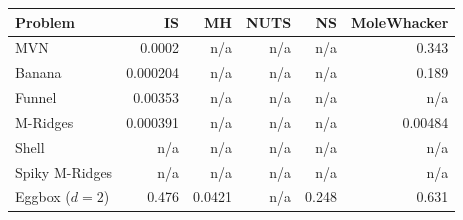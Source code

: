 \begin{tabular}{lrrrrr}
\toprule
Problem & IS & MH & NUTS & NS & MoleWhacker \\
\midrule
MVN & 0.0002 & n/a & n/a & n/a & 0.343 \\
Banana & 0.000204 & n/a & n/a & n/a & 0.189 \\
Funnel & 0.00353 & n/a & n/a & n/a & n/a \\
M-Ridges & 0.000391 & n/a & n/a & n/a & 0.00484 \\
Shell & n/a & n/a & n/a & n/a & n/a \\
Spiky M-Ridges & n/a & n/a & n/a & n/a & n/a \\
\midrule
Eggbox ($d=2$) & 0.476 & 0.0421 & n/a & 0.248 & 0.631 \\
\bottomrule
\end{tabular}
